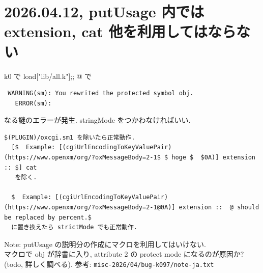 \documentclass{jarticle}
\begin{document}
\section{2026.04.12, putUsage 内では extension, cat 他を利用してはならない}

k0 で \verb@ load["lib/all.k"];; @ で 
\begin{verbatim}
 WARNING(sm): You rewrited the protected symbol obj.
   ERROR(sm): 
\end{verbatim}
なる謎のエラーが発生. stringMode をつかわなければいい.

\begin{verbatim}
$(PLUGIN)/oxcgi.sm1 を除いたら正常動作.
  [$  Example: [(cgiUrlEncodingToKeyValuePair) (https://www.openxm/org/?oxMessageBody=2-1$ $ hoge $  $0A)] extension :: $] cat
   を除く.  

  $  Example: [(cgiUrlEncodingToKeyValuePair) (https://www.openxm/org/?oxMessageBody=2-1@0A)] extension ::  @ should be replaced by percent.$  
  に置き換えたら strictMode でも正常動作.
\end{verbatim}

\noindent
{\color{red} Note: putUsage の説明分の作成にマクロを利用してはいけない.} \\
マクロで obj が辞書に入り, attribute 2 の protect mode になるのが原因か? (todo, 詳しく調べる).
参考: {\tt misc-2026/04/bug-k097/note-ja.txt}
\end{document}
